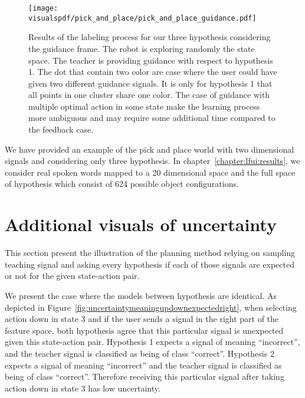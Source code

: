 \begin{figure}[!ht]
  \centering
  \texttt{[image: \\visualspdf/pick\_and\_place/pick\_and\_place\_guidance.pdf]}
  \caption{Results of the labeling process for our three hypothesis considering the guidance frame. The robot is exploring randomly the state space. The teacher is providing guidance with respect to hypothesis 1. The dot that contain two color are case where the user could have given two different guidance signals. It is only for hypothesis 1 that all points in one cluster share one color. The case of guidance with multiple optimal action in some state make the learning process more ambiguous and may require some additional time compared to the feedback case.}
  \label{fig:lfui:pickplaceguidance}
\end{figure}

We have provided an example of the pick and place world with two dimensional signals and considering only three hypothesis. In chapter~\ref{chapter:lfui:results}, we consider real spoken words mapped to a 20 dimensional space and the full space of hypothesis which consist of 624 possible object configurations.


\section{Additional visuals of uncertainty}
\label{appendix:uncertaintymeaning}

This section present the illustration of the planning method relying on sampling teaching signal and  asking every hypothesis if each of those signals are expected or not for the given state-action pair. 

We present the case where the models between hypothesis are identical. As depicted in Figure~\ref{fig:uncertaintymeaningupdownexpectedright}, when selecting action down in state 3 and if the user sends a signal in the right part of the feature space, both hypothesis agree that this particular signal is unexpected given this state-action pair. Hypothesis 1 expects a signal of meaning ``incorrect'', and the teacher signal is classified as being of class ``correct''. Hypothesis 2 expects a signal of meaning ``incorrect'' and the teacher signal is classified as being of class ``correct''. Therefore receiving this particular signal after taking action down in state 3 has low uncertainty.

